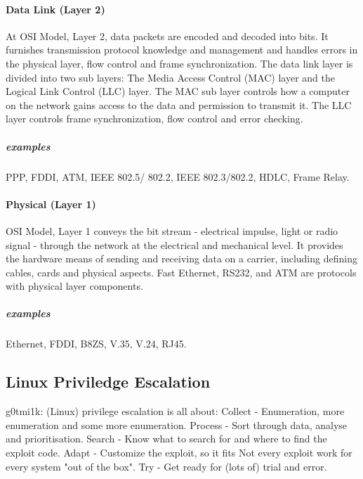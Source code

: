 \documentclass{article}[12pt]
\begin{document}
\paragraph{Data Link (Layer 2)}
At OSI Model, Layer 2, data packets are encoded and decoded into bits.
It furnishes transmission protocol knowledge and management and handles errors in the physical layer, flow control and frame synchronization.
The data link layer is divided into two sub layers: The Media Access Control (MAC) layer and the Logical Link Control (LLC) layer.
The MAC sub layer controls how a computer on the network gains access to the data and permission to transmit it.
The LLC layer controls frame synchronization, flow control and error checking.
\subparagraph{examples} PPP, FDDI, ATM, IEEE 802.5/ 802.2, IEEE 802.3/802.2, HDLC, Frame Relay.


\paragraph{Physical (Layer 1)}
OSI Model, Layer 1 conveys the bit stream - electrical impulse, light or radio signal - through the network at the electrical and mechanical level.
It provides the hardware means of sending and receiving data on a carrier, including defining cables, cards and physical aspects.
Fast Ethernet, RS232, and ATM are protocols with physical layer components.
\subparagraph{examples} Ethernet, FDDI, B8ZS, V.35, V.24, RJ45.



\subsection{Linux Priviledge Escalation}

g0tmi1k: (Linux) privilege escalation is all about:
\newline
Collect - Enumeration, more enumeration and some more enumeration. \newline
Process - Sort through data, analyse and prioritisation. \newline
Search - Know what to search for and where to find the exploit code. \newline
Adapt - Customize the exploit, so it fits
Not every exploit work for every system "out of the box". \newline
Try - Get ready for (lots of) trial and error. \newline
\end{document}
